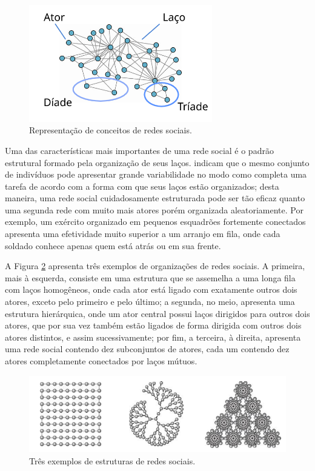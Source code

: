 \begin{figure}[ht]
    \centering
    \includegraphics[width=8cm]{imagens/social_network.png}
    \caption{Representação de conceitos de redes sociais.}
    \label{fig:networkDefs}
\end{figure}

Uma das características mais importantes de uma rede social é o padrão estrutural formado pela organização de seus laços.  indicam que o mesmo conjunto de indivíduos pode apresentar grande variabilidade no modo como completa uma tarefa de acordo com a forma com que seus laços estão organizados; desta maneira, uma rede social cuidadosamente estruturada pode ser tão eficaz quanto uma segunda rede com muito mais atores porém organizada aleatoriamente. Por exemplo, um exército organizado em pequenos esquadrões fortemente conectados apresenta uma efetividade muito superior a um arranjo em fila, onde cada soldado conhece apenas quem está atrás ou em sua frente.

A Figura \ref{fig:structures} apresenta três exemplos de organizações de redes sociais. A primeira, mais à esquerda, consiste em uma estrutura que se assemelha a uma longa fila com laços homogêneos, onde cada ator está ligado com exatamente outros dois atores, exceto pelo primeiro e pelo último; a segunda, no meio, apresenta uma estrutura hierárquica, onde um ator central possui laços dirigidos para outros dois atores, que por sua vez também estão ligados de forma dirigida com outros dois atores distintos, e assim sucessivamente; por fim, a terceira, à direita, apresenta uma rede social contendo dez subconjuntos de atores, cada um contendo dez atores completamente conectados por laços mútuos.

\begin{figure}[ht]
    \centering
    \includegraphics[width=15cm]{imagens/social_structures.png}
    \caption{Três exemplos de estruturas de redes sociais.}
    \label{fig:structures}
\end{figure}

